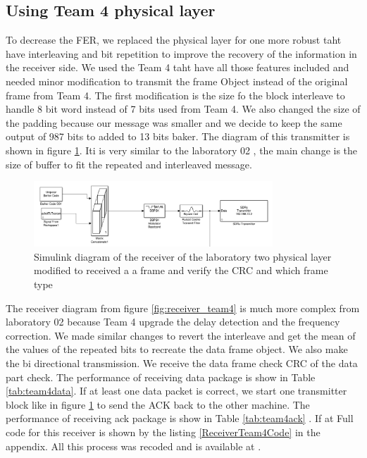 \subsection{Using Team 4 physical layer}
\label{team4_results}
To decrease the FER, we replaced the physical layer for one more robust taht have interleaving and bit repetition to improve the recovery of the information in the receiver side.
We used the Team 4 taht have all those features included and needed minor modification to transmit the frame Object instead of the original frame from Team 4.
The first modification is the size fo the block interleave to handle 8 bit word instead of 7 bits used from Team 4. We also changed the size of the padding because our message was smaller and we decide to keep the same output of 987 bits to added to 13 bits baker. The diagram of this transmitter is shown in figure \ref{fig:transmitter_team4}. Iti is very similar to the laboratory 02 , the main change is the size of buffer to fit the repeated and interleaved message.  
\begin{figure}[ht]
    \centering
    \includegraphics[width=0.8\textwidth]{transmitter_team4.PNG}
    \caption{Simulink diagram of the receiver of the laboratory two physical layer modified to received a a frame and verify the CRC and which frame type }
    \label{fig:transmitter_team4}
\end{figure}

The receiver diagram from figure \ref{fig:receiver_team4} is much more complex from laboratory 02 because Team 4 upgrade the delay detection and the frequency correction.
We made similar changes to revert the interleave and get the mean of the values of the repeated bits to recreate the data frame object.
We also make the bi directional transmission. We receive the data frame check CRC of the data part check. The performance of receiving data package is show in Table \ref{tab:team4data}. If at least one data packet is correct, we start one transmitter block like in figure \ref{fig:transmitter_team4} to send the ACK back to the other machine. The performance of receiving ack package is show in Table \ref{tab:team4ack} . If at Full code for this receiver is shown by the listing \ref{ReceiverTeam4Code} in the appendix. All this process was recoded and is available at \cite{videodemo}. 
 

